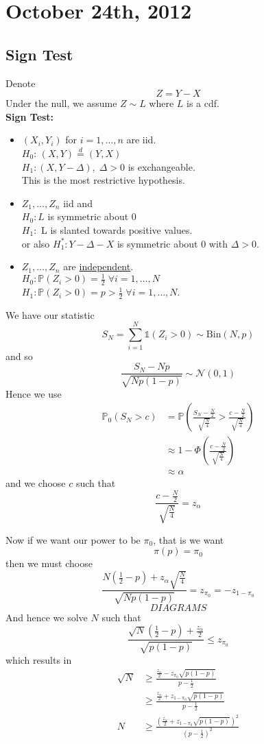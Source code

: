 \documentclass[a4paper,12pt]{amsart}
\newcommand{\sumiN}{\sum_{i=1}^N}
\newcommand{\p}[1]{\mathbb{P}\left(#1\right)}
\begin{document}
\section{October 24th, 2012}
\subsection{Sign Test}
Denote 
\[Z = Y - X\]
Under the null, we assume $Z \sim L$ where $L$ is a cdf.\\
\textbf{Sign Test:} 
\begin{itemize}
\item $(X_i,Y_i)$ for $i=1,\ldots,n$ are iid.\\
$H_0$: $(X,Y) \overset{d}{=} (Y,X)$\\
$H_1: (X,Y-\Delta), \; \Delta >0$ is exchangeable.\\
This is the most restrictive hypothesis.
\item $Z_1, \ldots, Z_n$ iid and\\
$H_0: L$ is symmetric about $0$\\
$H_1:$ L is slanted towards positive values.\\
or also $H_1^*: Y-\Delta-X$ is symmetric about 0 with $\Delta >0$.
\item $Z_1, \ldots, Z_n$ are \underline{independent}.\\
$H_0: \p{Z_i>0} = \frac{1}{2} \; \forall i = 1, \ldots, N$ \\
$H_1: \p{Z_i >0} = p > \frac{1}{2} \; \forall i = 1, \ldots, N$.
\end{itemize}

We have our statistic
\[S_N = \sumiN \mathds{1}(Z_i > 0) \sim \mbox{Bin}(N,p)\]
and so 
\[\frac{S_N - Np}{\sqrt{Np(1-p)}} \sim \mathcal{N}(0,1)\]
Hence we use 
\begin{align*}
\mathbb{P}_0(S_N>c) &= \p{\frac{S_N-\frac{N}{2}}{\sqrt{\frac{N}{4}}} > \frac{c-\frac{N}{2}}{\sqrt{\frac{N}{4}}}}\\
&\approx 1 - \Phi\left(\frac{c-\frac{N}{2}}{\sqrt{\frac{N}{4}}}\right)\\
&\approx \alpha
\end{align*}
and we choose $c$ such that
\[\frac{c-\frac{N}{2}}{\sqrt{\frac{N}{4}}} = z_\alpha\]

Now if we want our power to be $\pi_0$, that is we want
\[\pi(p) = \pi_0\]
then we must choose
\[\frac{N(\frac{1}{2}-p) + z_\alpha \sqrt{\frac{N}{4}}}{\sqrt{Np(1-p)}} = z_{\pi_0} = -z_{1-\pi_0}\]
$$DIAGRAMS$$
And hence we solve $N$ such that
\[\frac{\sqrt{N}(\frac{1}{2} -p) + \frac{z_\alpha}{2}}{\sqrt{p(1-p)}} \leq z_{\pi_0}\]
which results in 
\begin{align*}\sqrt{N} &\geq \frac{\frac{z_\alpha}{2} - z_{\pi_0}\sqrt{p(1-p)}}{p-\frac{1}{2}}\\
&\geq  \frac{\frac{z_\alpha}{2} + z_{1-\pi_0}\sqrt{p(1-p)}}{p-\frac{1}{2}}\\
N & \geq \frac{\left(\frac{z_\alpha}{2} + z_{1 - \pi_0}\sqrt{p(1-p)}\right)^2}{(p-\frac{1}{2})^2}
\end{align*}
\end{document}
